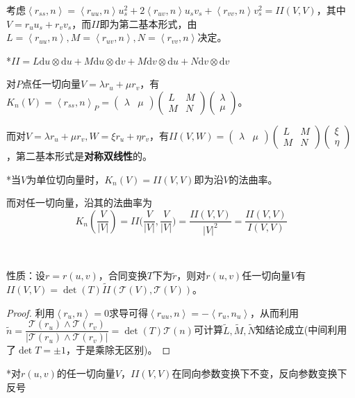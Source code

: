 \documentclass[a4paper,UTF8,fontset=windows]{ctexart}
\begin{document}
考虑$\left<r_{ss},n\right>=\left<r_{uu},n\right>u_s^2+2\left<r_{uv},n\right>u_sv_s+\left<r_{vv},n\right>v_s^2=II(V,V)$，其中$V=r_uu_s+r_vv_s$，而$II$即为第二基本形式，由$L=\left<r_{uu},n\right>,M=\left<r_{uv},n\right>,N=\left<r_{vv},n\right>$决定。

*$II=L\mathrm{d}u\otimes\mathrm{d}u+M\mathrm{d}u\otimes\mathrm{d}v+M\mathrm{d}v\otimes\mathrm{d}u+N\mathrm{d}v\otimes\mathrm{d}v$

对$P$点任一切向量$V=\lambda r_u+\mu r_v$，有$K_n(V)=\left<r_{ss},n\right>_P=\begin{pmatrix}\lambda&\mu\end{pmatrix}\begin{pmatrix}L&M\\M&N\end{pmatrix}\begin{pmatrix}\lambda\\\mu\end{pmatrix}$。

而对$V=\lambda r_u+\mu r_v,W=\xi r_u+\eta r_v$，有$II(V,W)=\begin{pmatrix}\lambda&\mu\end{pmatrix}\begin{pmatrix}L&M\\M&N\end{pmatrix}\begin{pmatrix}\xi\\\eta\end{pmatrix}$，第二基本形式是\textbf{对称双线性}的。

*当$V$为单位切向量时，$K_n(V)=II(V,V)$即为沿$V$的法曲率。

而对任一切向量，沿其的法曲率为
$$K_n(\frac{V}{|V|})=II\big(\frac{V}{|V|},\frac{V}{|V|}\big)=\frac{II(V,V)}{|V|^2}=\frac{II(V,V)}{I(V,V)}$$

\

性质：设$r=r(u,v)$，合同变换$T$下为$\tilde{r}$，则对$r(u,v)$任一切向量$V$有$II(V,V)=\det(T)\tilde{II}(\mathcal{T}(V),\mathcal{T}(V))$。

\begin{proof}
利用$\left<r_u,n\right>=0$求导可得$\left<r_{uu},n\right>=-\left<r_u,n_u\right>$，从而利用$\tilde{n}=\dfrac{\mathcal{T}(r_u)\wedge \mathcal{T}(r_v)}{|\mathcal{T}(r_u)\wedge \mathcal{T}(r_v)|}=\det(T)\mathcal{T}(n)$可计算$\tilde{L},\tilde{M},\tilde{N}$知结论成立(中间利用了$\det T=\pm1$，于是乘除无区别)。
\end{proof}

*对$r(u,v)$的任一切向量$V$，$II(V,V)$在同向参数变换下不变，反向参数变换下反号
\end{document}
